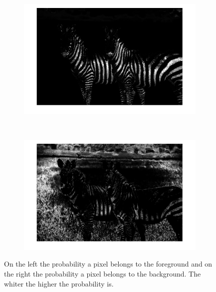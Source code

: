 \documentclass{paper}
\begin{document}
\begin{figure}[H]
    \centering
    \begin{subfigure}{0.45\textwidth}
        \includegraphics[width=\textwidth]{../../outputs/p4/image_segmentation/zebra2/prob_fg}
    \end{subfigure}
    ~
        \begin{subfigure}{0.45\textwidth}
        \includegraphics[width=\textwidth]{../../outputs/p4/image_segmentation/zebra2/prob_bg}
    \end{subfigure}
    
    \caption{On the left the probability a pixel belongs to the foreground and on the right the probability a pixel belongs to the background. The whiter the higher the probability is.}
    \label{fig:segmentation_zebra2_probabilities}       
\end{figure}
\end{document}
